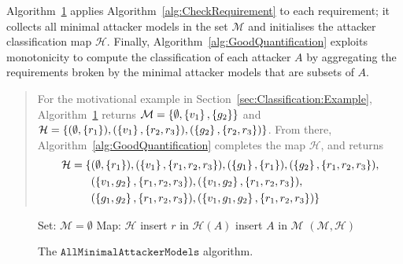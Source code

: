 {\color{red}
Algorithm~\ref{alg:MinimalAttackerModels} applies Algorithm~\ref{alg:CheckRequirement} to each requirement; it collects all minimal attacker models in the set $\mathcal{M}$ and initialises the attacker classification map $\mathcal{H}$. Finally, Algorithm~\ref{alg:GoodQuantification} exploits monotonicity to compute the classification of each attacker $A$ by aggregating the requirements broken by the minimal attacker models that are subsets of $A$.

\begin{quote}
For the motivational example in Section~\ref{sec:Classification:Example}, Algorithm~\ref{alg:MinimalAttackerModels} returns $\mathcal{M}=\left\{\emptyset,\left\{v_1\right\}, \left\{g_2\right\}\right\}$ and $\mathcal{H}=\left\{(\emptyset,\left\{r_1\right\}), (\left\{v_1\right\},\left\{r_2, r_3\right\}),  (\left\{g_2\right\},\left\{r_2, r_3\right\})\right\}$. From there,  Algorithm~\ref{alg:GoodQuantification} completes the map $\mathcal{H}$, and returns
\begin{align*}
\mathcal{H}=\{&(\emptyset,\left\{r_1\right\}), (\left\{v_1\right\},\left\{r_1,r_2, r_3\right\}),  (\left\{g_1\right\},\left\{r_1\right\}),(\left\{g_2\right\},\left\{r_1,r_2, r_3\right\}), \\
&(\left\{v_1,g_2\right\},\left\{r_1,r_2, r_3\right\}),(\left\{v_1,g_2\right\},\left\{r_1,r_2, r_3\right\}),\\
&(\left\{g_1,g_2\right\},\left\{r_1,r_2, r_3\right\}),(\left\{v_1,g_1,g_2\right\},\left\{r_1,r_2, r_3\right\})\}
\end{align*}
\end{quote}
\vspace{-0.5cm}

\begin{figure}[!t]
\centering
{
\begin{algorithm}[H]
Set: $\mathcal{M}=\emptyset$\;
Map: $\mathcal{H}$\;
	{
		{
			insert $r$ in $\mathcal{H}(A)$\;
			insert $A$ in $\mathcal{M}$\;
		}
	 }
 \Return $(\mathcal{M},\mathcal{H})$\;
 \caption{The $\mathtt{AllMinimalAttackerModels}$ algorithm. }
 \label{alg:MinimalAttackerModels}
\end{algorithm}}
\vspace{-0.5cm}
\end{figure}


\begin{figure}[!t]
\centering
{
\begin{algorithm}[H]


\end{algorithm}}
\end{figure}}
